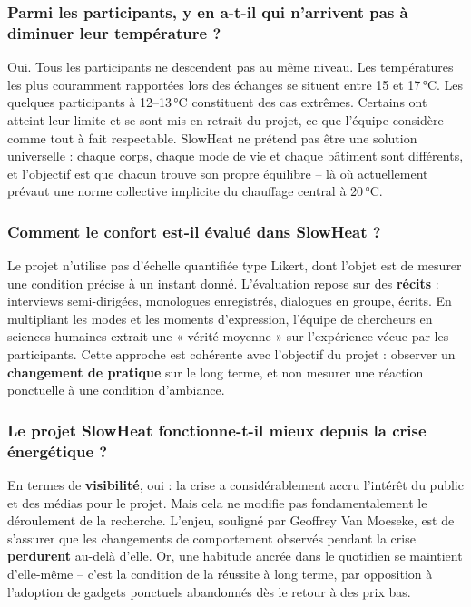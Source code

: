 \subsubsection{Parmi les participants, y en a-t-il qui n'arrivent pas à diminuer leur température ?}

Oui. Tous les participants ne descendent pas au même niveau. Les températures les plus couramment rapportées lors des échanges se situent entre 15 et 17\,°C. Les quelques participants à 12--13\,°C constituent des cas extrêmes. Certains ont atteint leur limite et se sont mis en retrait du projet, ce que l'équipe considère comme tout à fait respectable. SlowHeat ne prétend pas être une solution universelle : chaque corps, chaque mode de vie et chaque bâtiment sont différents, et l'objectif est que chacun trouve son propre équilibre -- là où actuellement prévaut une norme collective implicite du chauffage central à 20\,°C.

\subsubsection{Comment le confort est-il évalué dans SlowHeat ?}

Le projet n'utilise pas d'échelle quantifiée type Likert, dont l'objet est de mesurer une condition précise à un instant donné. L'évaluation repose sur des \textbf{récits} : interviews semi-dirigées, monologues enregistrés, dialogues en groupe, écrits. En multipliant les modes et les moments d'expression, l'équipe de chercheurs en sciences humaines extrait une « vérité moyenne » sur l'expérience vécue par les participants. Cette approche est cohérente avec l'objectif du projet : observer un \textbf{changement de pratique} sur le long terme, et non mesurer une réaction ponctuelle à une condition d'ambiance.

\subsubsection{Le projet SlowHeat fonctionne-t-il mieux depuis la crise énergétique ?}

En termes de \textbf{visibilité}, oui : la crise a considérablement accru l'intérêt du public et des médias pour le projet. Mais cela ne modifie pas fondamentalement le déroulement de la recherche. L'enjeu, souligné par Geoffrey Van Moeseke, est de s'assurer que les changements de comportement observés pendant la crise \textbf{perdurent} au-delà d'elle. Or, une habitude ancrée dans le quotidien se maintient d'elle-même -- c'est la condition de la réussite à long terme, par opposition à l'adoption de gadgets ponctuels abandonnés dès le retour à des prix bas.

